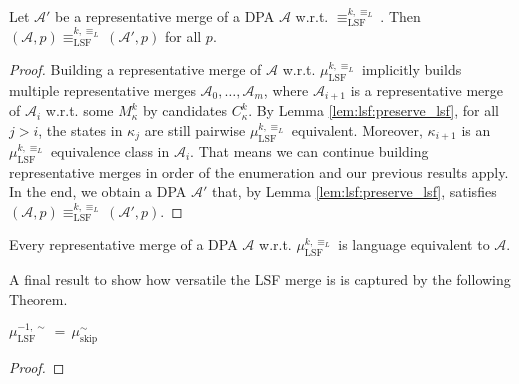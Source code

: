 \begin{theorem}
	Let $\mathcal{A}'$ be a representative merge of a DPA $\mathcal{A}$ w.r.t. $\equiv_\text{LSF}^{k,\equiv_L}$. Then $(\mathcal{A}, p) \equiv_\text{LSF}^{k,\equiv_L} (\mathcal{A}', p)$ for all $p$.
\end{theorem}

\begin{proof}
		Building a representative merge of $\mathcal{A}$ w.r.t. $\mu_\text{LSF}^{k,\equiv_L}$ implicitly builds multiple representative merges $\mathcal{A}_0, \dots, \mathcal{A}_m$, where $\mathcal{A}_{i+1}$ is a representative merge of $\mathcal{A}_i$ w.r.t. some $M^k_\kappa$ by candidates $C^k_\kappa$. By Lemma \ref{lem:lsf:preserve_lsf}, for all $j > i$, the states in $\kappa_j$ are still pairwise $\mu_\text{LSF}^{k,\equiv_L}$ equivalent. Moreover, $\kappa_{i+1}$ is an $\mu_\text{LSF}^{k,\equiv_L}$ equivalence class in $\mathcal{A}_i$. That means we can continue building representative merges in order of the enumeration and our previous results apply. In the end, we obtain a DPA $\mathcal{A}'$ that, by Lemma \ref{lem:lsf:preserve_lsf}, satisfies $(\mathcal{A}, p) \equiv_\text{LSF}^{k,\equiv_L} (\mathcal{A}', p)$.
\end{proof}

\begin{cor}
	Every representative merge of a DPA $\mathcal{A}$ w.r.t. $\mu_\text{LSF}^{k,\equiv_L}$ is language equivalent to $\mathcal{A}$.
\end{cor}

\vspace{10pt}

A final result to show how versatile the LSF merge is is captured by the following Theorem.

\begin{theorem}
	$\mu_\text{LSF}^{-1,\sim} \,=\, \mu_\text{skip}^\sim$
\end{theorem}

\begin{proof}
\end{proof}
















